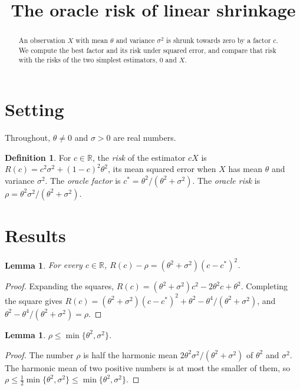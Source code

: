 \documentclass[11pt]{article}
\title{The oracle risk of linear shrinkage}
\author{}
\date{}
\newtheorem{lemma}[theorem]{Lemma}
\theoremstyle{definition}
\newtheorem{definition}[theorem]{Definition}
\begin{document}
\maketitle

\begin{abstract}
An observation $X$ with mean $\theta$ and variance $\sigma^2$ is shrunk towards zero by a factor $c$. We compute the
best factor and its risk under squared error, and compare that risk with the risks of the two simplest
estimators, $0$ and $X$.
\end{abstract}

\section{Setting}

Throughout, $\theta \ne 0$ and $\sigma > 0$ are real numbers.

\begin{definition}\label{def:risk}
For $c \in \mathbb{R}$, the \emph{risk} of the estimator $cX$ is
$R(c) = c^2 \sigma^2 + (1-c)^2 \theta^2$, its mean squared error when $X$ has mean $\theta$ and variance $\sigma^2$.
The \emph{oracle factor} is
$c^\ast = \theta^2 / (\theta^2 + \sigma^2)$.
The \emph{oracle risk} is
$\rho = \theta^2 \sigma^2 / (\theta^2 + \sigma^2)$.
\end{definition}

\section{Results}

\begin{lemma}\label{lem:square}
For every $c \in \mathbb{R}$, $R(c) - \rho = (\theta^2 + \sigma^2)(c - c^\ast)^2$.
\end{lemma}

\begin{proof}
Expanding the squares, $R(c) = (\theta^2 + \sigma^2) c^2 - 2 \theta^2 c + \theta^2$. Completing the square gives
$R(c) = (\theta^2 + \sigma^2)(c - c^\ast)^2 + \theta^2 - \theta^4 / (\theta^2 + \sigma^2)$, and
$\theta^2 - \theta^4 / (\theta^2 + \sigma^2) = \rho$.
\end{proof}

\begin{lemma}\label{lem:min}
$\rho \le \min\{\theta^2, \sigma^2\}$.
\end{lemma}

\begin{proof}
The number $\rho$ is half the harmonic mean $2\theta^2\sigma^2 / (\theta^2 + \sigma^2)$ of $\theta^2$ and
$\sigma^2$. The harmonic mean of two positive numbers is at most the smaller of them, so
$\rho \le \frac12 \min\{\theta^2, \sigma^2\} \le \min\{\theta^2, \sigma^2\}$.
\end{proof}
\end{document}

